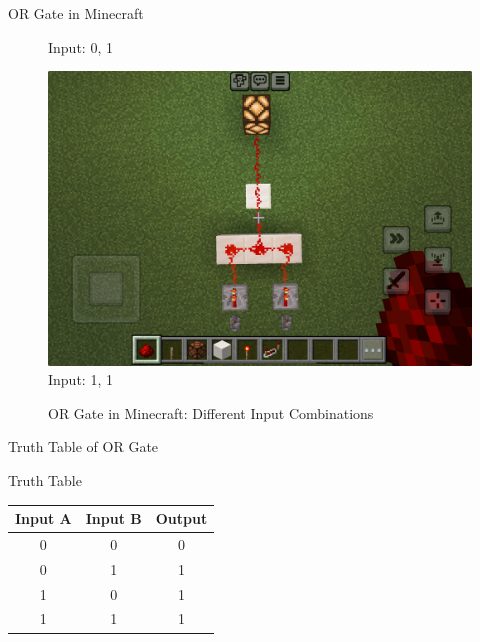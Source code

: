 \documentclass{beamer}
\begin{document}
\begin{frame}{OR Gate in Minecraft}
\begin{figure}[ht]
\begin{minipage}{0.32\textwidth}
            \small Input: 0, 1
        \end{minipage}
        \begin{minipage}{0.32\textwidth}
            \centering
            \includegraphics[width=\textwidth]{images/orgate_11.png}\\
            \small Input: 1, 1
        \end{minipage}
        \caption{OR Gate in Minecraft: Different Input Combinations}
    \end{figure}
\end{frame}

\begin{frame}{Truth Table of OR Gate}
    \begin{block}{Truth Table}
        \begin{tabular}{|c|c|c|}
            \hline
            Input A & Input B & Output \\
            \hline
            0 & 0 & 0 \\
            0 & 1 & 1 \\
            1 & 0 & 1 \\
            1 & 1 & 1 \\
            \hline
        \end{tabular}
    \end{block}
\end{frame}
\end{document}
